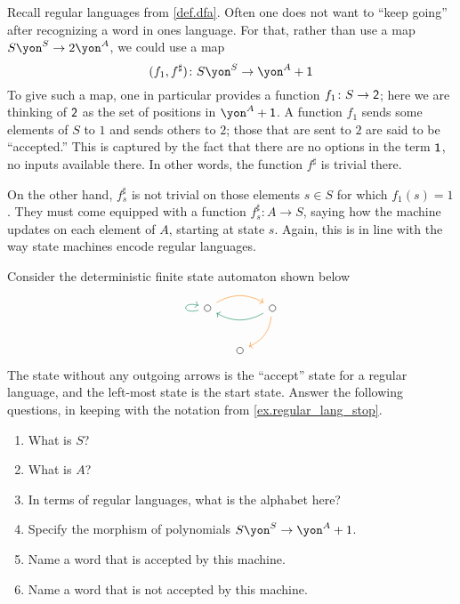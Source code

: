 \documentclass[Book-Poly]{subfiles}
\begin{document}
\begin{example}\label{ex.regular_lang_stop}
Recall regular languages from \cref{def.dfa}. Often one does not want to ``keep going'' after recognizing a word in ones language. For that, rather than use a map $S\yon^S\to 2\yon^A$, we could use a map
\[
(f_1,f^\sharp)\colon S\yon^S\to \yon^A+\1
\]
To give such a map, one in particular provides a function $f_1\colon S\to\textsf{2}$; here we are thinking of $\textsf{2}$ as the set of positions in $\yon^A+\1$. A function $f_1$ sends some elements of $S$ to $1$ and sends others to $2$; those that are sent to $2$ are said to be ``accepted.'' This is captured by the fact that there are no options in the term $\textsf{1}$, no inputs available there. In other words, the function $f^\sharp$ is trivial there.

On the other hand, $f^\sharp_s$ is not trivial on those elements $s\in S$ for which $f_1(s)=1$. They must come equipped with a function $f^\sharp_s\colon A\to S$, saying how the machine updates on each element of $A$, starting at state $s$. Again, this is in line with the way state machines encode regular languages.
\end{example}

\begin{exercise}\label{exc.det_fsa_misc_398}
Consider the deterministic finite state automaton shown below
\[
\begin{tikzcd}[column sep=small]
	\LMO{}\ar[rr, bend left, orange]\ar[loop left, dgreen]&&
	\LMO{}\ar[dl, bend left, orange]\ar[ll, dgreen, bend left]\\&
	\LMO{}
\end{tikzcd}
\]
The state without any outgoing arrows is the ``accept'' state for a regular language, and the left-most state is the start state. Answer the following questions, in keeping with the notation from \cref{ex.regular_lang_stop}.

\begin{enumerate}
	\item What is $S$?
	\item What is $A$?
	\item In terms of regular languages, what is the alphabet here?
	\item Specify the morphism of polynomials $S\yon^S\to\yon^A+1$.
	\item Name a word that is accepted by this machine.
	\item Name a word that is not accepted by this machine.
\qedhere
\end{enumerate}
\end{exercise}
\end{document}
